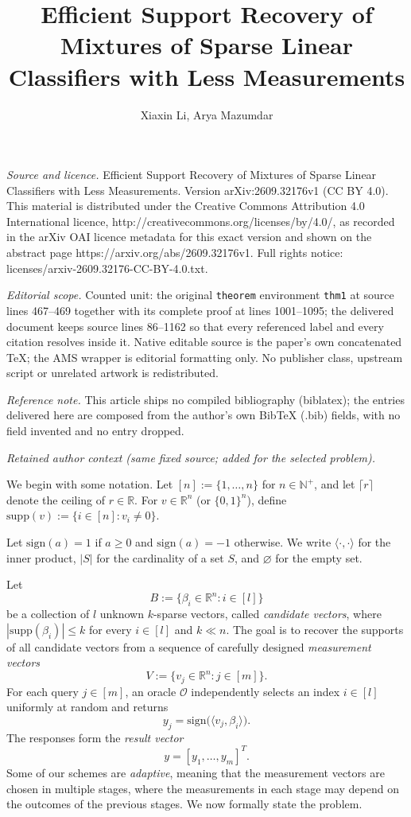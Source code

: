 \documentclass[10pt,a4paper]{amsart}
\newcommand{\supp}{\mathrm{supp}}
\newcommand{\sign}{\mathrm{sign}}
\begin{document}
\title[Support recovery of sparse classifier mixtures]{Efficient Support Recovery of Mixtures of Sparse Linear Classifiers with Less Measurements}
\author{Xiaxin Li, Arya Mazumdar}
\date{}
\maketitle
\noindent\emph{Source and licence.} Efficient Support Recovery of Mixtures of Sparse Linear Classifiers with Less Measurements. Version arXiv:2609.32176v1 (CC BY 4.0). This material is distributed under the Creative Commons Attribution 4.0 International licence, http://creativecommons.org/licenses/by/4.0/, as recorded in the arXiv OAI licence metadata for this exact version and shown on the abstract page https://arxiv.org/abs/2609.32176v1. Full rights notice: licenses/arxiv-2609.32176-CC-BY-4.0.txt.\par\smallskip
\noindent\textit{Editorial scope.} Counted unit: the original \texttt{theorem} environment \texttt{thm1} at source lines 467--469 together with its complete proof at lines 1001--1095; the delivered document keeps source lines 86--1162 so that every referenced label and every citation resolves inside it. Native editable source is the paper's own concatenated TeX; the AMS wrapper is editorial formatting only. No publisher class, upstream script or unrelated artwork is redistributed.\par\smallskip\noindent\textit{Reference note.} This article ships no compiled bibliography (biblatex); the entries delivered here are composed from the author's own BibTeX (.bib) fields, with no field invented and no entry dropped.
\par\medskip\noindent\textit{Retained author context (same fixed source; added for the selected problem).}\par
We begin with some notation. Let $[n]:=\{1,\dots,n\}$ for $n\in\mathbb{N}^+$, and let $\lceil r\rceil$ denote the ceiling of $r\in\mathbb{R}$. For $v\in\mathbb{R}^n$ (or $\{0,1\}^n$), define
\(
\supp(v):=\{i\in[n]:v_i\neq0\}.
\)

Let $\sign(a)=1$ if $a\ge0$ and $\sign(a)=-1$ otherwise. We write $\langle\cdot,\cdot\rangle$ for the inner product, $|S|$ for the cardinality of a set $S$, and $\varnothing$ for the empty set.

Let
\[
B:=\{\beta_i\in\mathbb{R}^n:i\in[l]\}
\]
be a collection of $l$ unknown $k$-sparse vectors, called \emph{candidate vectors}, where $|\supp(\beta_i)|\le k$ for every $i\in[l]$ and $k\ll n$. The goal is to recover the supports of all candidate vectors from a sequence of carefully designed \emph{measurement vectors}
\[
V:=\{v_j\in\mathbb{R}^n:j\in[m]\}.
\]
For each query $j\in[m]$, an oracle $\mathcal{O}$ independently selects an index $i\in[l]$ uniformly at random and returns
\[
y_j=\sign\bigl(\langle v_j,\beta_i\rangle\bigr).
\]
The responses form the \emph{result vector}
\[
y=[y_1,\dots,y_m]^T.
\]
Some of our schemes are \emph{adaptive}, meaning that the measurement vectors are chosen in multiple stages, where the measurements in each stage may depend on the outcomes of the previous stages. We now formally state the problem.
\end{document}
